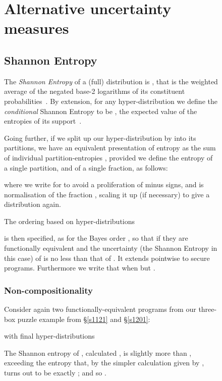 \documentclass[runningheads]{llncs}
\newcommand\Sec[1] {Sec.~\ref{#1}}
\renewcommand\Sec[1] {\S\ref{#1}}
\newenvironment{Figure}[2][t]{\begin{figure}[#1]\def\Label{#2}\small}{\label{\Label}\end{figure}}
\begin{document}
\begin{Figure}[ht!]{f1228}
\section{Alternative uncertainty measures}\label{s3448}

\subsection{Shannon Entropy} \label{s3628}
The \emph{Shannon Entropy} of a (full) distribution  is , that is the weighted average of the negated base-2 logarithms of its constituent probabilities~\cite{Shannon:48}. By extension, for any hyper-distribution  we define the \emph{conditional} Shannon Entropy  to be , the expected value of the entropies of its support~\cite{Cachin:97}.

Going further, if we split up our hyper-distribution by  into its partitions, we have an equivalent presentation of entropy as the sum of individual partition-entropies , provided we define the entropy of a single partition, and of a single fraction, as follows:

where we write  for  to avoid a proliferation of minus signs, and  is normalisation of the fraction , scaling it up (if necessary) to give a distribution again.

The ordering  based on hyper-distributions

is then specified, as for the Bayes order , so that  if they are functionally equivalent and the uncertainty (the Shannon Entropy in this case) of  is no less than that of . It extends pointwise to secure programs. Furthermore we write that  when  but .

\subsubsection{Non-compositionality}
Consider again two functionally-equivalent programs from our three-box puzzle example from \Sec{s1121} and \Sec{s1201}:

with final hyper-distributions
\medskip\par\noindent
\hfill\hfill\makebox[0pt][r]{()}
\par\noindent
\hfill\hfill\makebox[0pt][r]{()}\medskip\par\noindent

The Shannon entropy of , calculated , is slightly more than , exceeding the entropy  that, by the simpler calculation given by , turns out to be exactly ; and so  .


\end{Figure}
\end{document}
